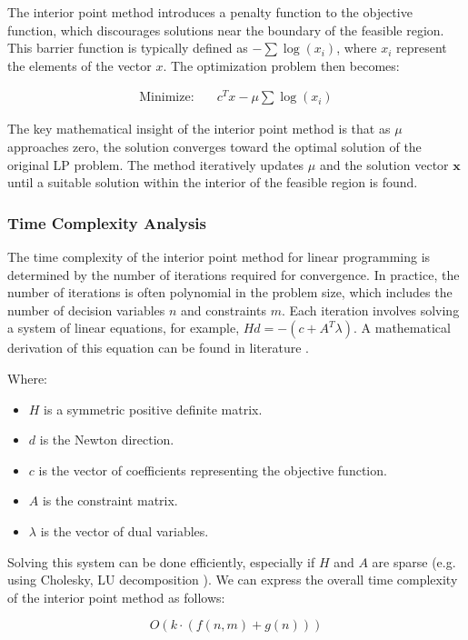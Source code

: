 The interior point method introduces a penalty function to the objective function, which discourages solutions near the boundary of the feasible region. This barrier function is typically defined as $-\sum \log(x_i)$, where $x_i$ represent the elements of the vector $x$.
The optimization problem then becomes:

\[
    \begin{aligned}
        \text{Minimize:} \quad & c^Tx - \mu \sum \log(x_i)
    \end{aligned}
\]

The key mathematical insight of the interior point method is that as $\mu$ approaches zero, the solution converges toward the optimal solution of the original LP problem. The method iteratively updates $\mu$ and the solution vector $\mathbf{x}$ until a suitable solution within the interior
of the feasible region is found.

\subsubsection{Time Complexity Analysis}
The time complexity of the interior point method for linear programming is determined by the number of iterations required for convergence. In practice, the number of iterations is often polynomial in
the problem size, which includes the number of decision variables $n$ and constraints $m$.
Each iteration involves solving a system of linear equations, for example, $Hd = -(c + A^T\lambda)$. A mathematical derivation of this equation can be found in literature \parencite{alizadeh1995interior}.

Where:
\begin{itemize}
    \item $H$ is a symmetric positive definite matrix.
    \item $d$ is the Newton direction.
    \item $c$ is the vector of coefficients representing the objective function.
    \item $A$ is the constraint matrix.
    \item $\lambda$ is the vector of dual variables.
\end{itemize}


Solving this system can be done efficiently, especially if $H$ and $A$ are sparse (e.g. using Cholesky, LU decomposition \parencite{golub2013matrix}).
We can express the overall time complexity of the interior point method as follows:

\[
    O(k \cdot (f(n, m) + g(n)))
\]

